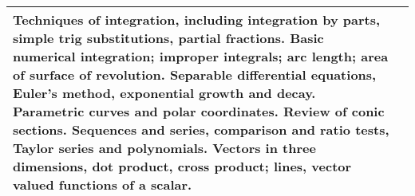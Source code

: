 \documentclass[12pt]{article}
\begin{document}
\begin{minipage}{\textwidth}
\begin{tabularx}{\textwidth}{|l|X|}
\begin{minipage}{.70\textwidth}
					Techniques of integration, including integration by parts, simple trig substitutions, partial fractions. Basic numerical integration; improper integrals; arc length; area of surface of revolution. Separable differential equations, Euler's method, exponential growth and decay. Parametric curves and polar coordinates. Review of conic sections. Sequences and series, comparison and ratio tests, Taylor series and polynomials. Vectors in three dimensions, dot product, cross product; lines, vector valued functions of a scalar.

					\vspace{3mm}
					\end{minipage} \\ \hline
\end{tabularx}
\end{minipage}


\bigskip
\bigskip
\end{document}
